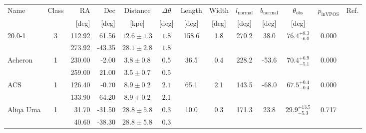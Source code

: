 \begin{tabular}{lcrrccccccccr}
	\toprule
	Name & Class & RA & Dec & Distance & $\Delta \theta$ & Length & Width & $l_\text{normal}$ & $b_\text{normal}$ & $\theta_\text{obs}$ & $p_\text{inVPOS}$ & Ref. \\
	 &  & [deg] & [deg] & [kpc] & [deg] & [deg] & [deg] & [deg] & [deg] & [deg] &  &  \\
	\midrule
	\multirow{2}{*}{20.0-1} & \multirow{2}{*}{3} & 112.92 & 61.56 & $12.6 \pm 1.3$ & $1.8$ & \multirow{2}{*}{158.6} & \multirow{2}{*}{1.8} & \multirow{2}{*}{270.2} & \multirow{2}{*}{38.0} & \multirow{2}{*}{$76.4^{+8.3}_{-6.0}$} & \multirow{2}{*}{0.000} & \multirow{2}{*}{\citet{Mateu:2018}} \\
	 &  & 273.92 & -43.35 & $28.1 \pm 2.8$ & $1.8$ &  &  &  &  &  &  &  \\
	\multirow{2}{*}{Acheron} & \multirow{2}{*}{1} & 230.00 & -2.00 & $3.8 \pm 0.8$ & $0.5$ & \multirow{2}{*}{36.5} & \multirow{2}{*}{0.4} & \multirow{2}{*}{228.2} & \multirow{2}{*}{-53.6} & \multirow{2}{*}{$70.4^{+6.9}_{-5.1}$} & \multirow{2}{*}{0.000} & \multirow{2}{*}{\citet{Grillmair:2009}} \\
	 &  & 259.00 & 21.00 & $3.5 \pm 0.7$ & $0.5$ &  &  &  &  &  &  &  \\
	\multirow{2}{*}{ACS} & \multirow{2}{*}{1} & 126.40 & -0.70 & $8.9 \pm 0.2$ & $2.1$ & \multirow{2}{*}{65.1} & \multirow{2}{*}{2.1} & \multirow{2}{*}{143.5} & \multirow{2}{*}{-68.0} & \multirow{2}{*}{$67.5^{+0.4}_{-0.4}$} & \multirow{2}{*}{0.000} & \multirow{2}{*}{\citet{Grillmair:2006a}} \\
	 &  & 133.90 & 64.20 & $8.9 \pm 0.2$ & $2.1$ &  &  &  &  &  &  &  \\
	\multirow{2}{*}{Aliqa Uma} & \multirow{2}{*}{1} & 31.70 & -31.50 & $28.8 \pm 5.8$ & $0.3$ & \multirow{2}{*}{10.0} & \multirow{2}{*}{0.3} & \multirow{2}{*}{171.3} & \multirow{2}{*}{23.8} & \multirow{2}{*}{$29.9^{+13.5}_{-5.3}$} & \multirow{2}{*}{0.717} & \multirow{2}{*}{\citet{Shipp:2018}} \\
	 &  & 40.60 & -38.30 & $28.8 \pm 5.8$ & $0.3$ &  &  &  &  &  &  &  \\
	\bottomrule
\end{tabular}
